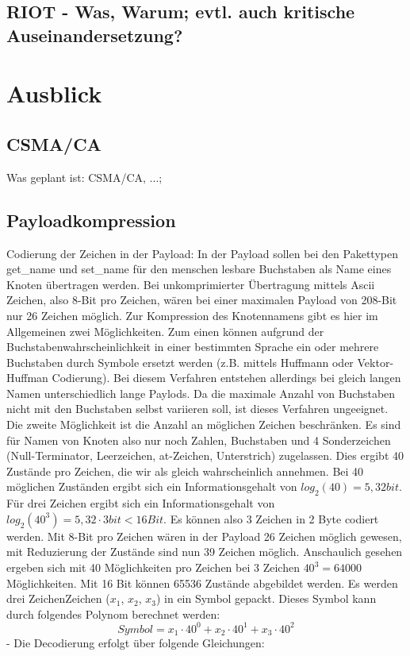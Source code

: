 \documentclass{IEEEtran}
\begin{document}
    \subsection{RIOT - Was, Warum; evtl. auch kritische Auseinandersetzung?}


\section{Ausblick}

    \subsection{CSMA/CA}
Was geplant ist: CSMA/CA, ...;

    \subsection{Payloadkompression}
    Codierung der Zeichen in der Payload: 
    In der Payload sollen bei den Pakettypen get\_name und set\_name für den menschen lesbare Buchstaben als Name eines Knoten übertragen werden. Bei unkomprimierter Übertragung mittels Ascii Zeichen, also 8-Bit pro Zeichen, wären bei einer maximalen Payload von 208-Bit nur 26 Zeichen möglich. Zur Kompression des Knotennamens gibt es hier im Allgemeinen zwei Möglichkeiten. Zum einen können aufgrund der Buchstabenwahrscheinlichkeit in einer bestimmten Sprache ein oder mehrere Buchstaben durch Symbole ersetzt werden (z.B. mittels Huffmann oder Vektor-Huffman Codierung). Bei diesem Verfahren entstehen allerdings bei gleich langen Namen unterschiedlich lange Paylods. Da die maximale Anzahl von Buchstaben nicht mit den Buchstaben selbst variieren soll, ist dieses Verfahren ungeeignet. Die zweite Möglichkeit ist die Anzahl an möglichen Zeichen beschränken. Es sind für Namen von Knoten also nur noch Zahlen, Buchstaben und 4 Sonderzeichen (Null-Terminator, Leerzeichen, at-Zeichen, Unterstrich) zugelassen. Dies ergibt 40 Zustände pro Zeichen, die wir als gleich wahrscheinlich annehmen. Bei 40 möglichen Zuständen ergibt sich ein Informationsgehalt von $log_{2}(40) = 5,32 bit$. Für drei Zeichen ergibt sich ein Informationsgehalt von $log_{2}(40^3) = 5,32 \cdot 3 bit < 16 Bit$. Es können also 3 Zeichen in 2 Byte codiert werden. Mit 8-Bit pro Zeichen wären in der Payload 26 Zeichen möglich gewesen, mit Reduzierung der Zustände sind nun 39 Zeichen möglich.
    Anschaulich gesehen ergeben sich mit 40 Möglichkeiten pro Zeichen bei 3 Zeichen $40^3 = 64000$ Möglichkeiten. Mit 16 Bit können 65536 Zustände abgebildet werden. 
    Es werden drei ZeichenZeichen ($x_{1}$, $x_{2}$, $x_{3}$) in ein Symbol gepackt. Dieses Symbol kann durch folgendes Polynom berechnet werden:
    $$Symbol = x_{1} \cdot 40^{0} + x_{2} \cdot 40^{1} + x_{3} \cdot 40^{2}$$
    - Die Decodierung erfolgt über folgende Gleichungen:
\end{document}
